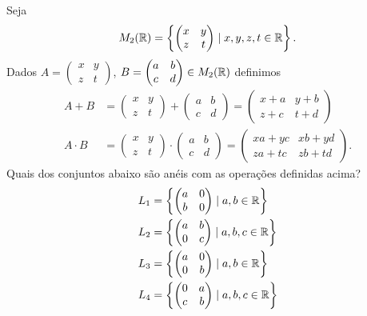 \documentclass[12pt]{article}
\begin{document}
\questao Seja
\[
	M_2(\mathbb{R}) = \left\{\begin{pmatrix}
		x & y\\z & t 
	\end{pmatrix} \mid x, y, z, t \in \mathbb{R} \right\}.
\]
Dados $A = \begin{pmatrix}
		x & y\\z & t 
	\end{pmatrix}$, $B = \begin{pmatrix}
		a & b\\c & d 
	\end{pmatrix} \in M_2(\mathbb{R})$ definimos
\begin{align*}
	A + B &= \begin{pmatrix}
		x & y\\z & t 
	\end{pmatrix} + \begin{pmatrix}
		a & b\\c & d 
	\end{pmatrix} = \begin{pmatrix}
		x + a & y + b\\z + c & t + d 
	\end{pmatrix}\\
	A \cdot B &= \begin{pmatrix}
		x & y\\z & t 
	\end{pmatrix} \cdot \begin{pmatrix}
		a & b\\c & d 
	\end{pmatrix} = \begin{pmatrix}
		xa + yc & xb + yd\\za + tc & zb + td 
	\end{pmatrix}.
\end{align*}
Quais dos conjuntos abaixo são anéis com as operações definidas acima?
\begin{align*}
	L_1 &= \left\{\begin{pmatrix}
		a & 0\\
		b & 0
	\end{pmatrix} \mid a, b \in \mathbb{R}\right\}\\
	L_2 &= \left\{\begin{pmatrix}
		a & b\\
		0 & c
	\end{pmatrix} \mid a, b, c \in \mathbb{R}\right\}\\
	L_3 &= \left\{\begin{pmatrix}
		a & 0\\
		0 & b
	\end{pmatrix} \mid a, b \in \mathbb{R}\right\}\\
	L_4 &= \left\{\begin{pmatrix}
		0 & a\\
		c & b
	\end{pmatrix} \mid a, b, c \in \mathbb{R}\right\}
\end{align*}
\end{document}

